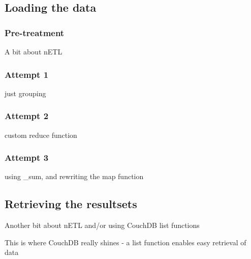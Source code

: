 \subsection{Loading the data}
\subsubsection*{Pre-treatment}
A bit about nETL

\subsubsection*{Attempt 1}
just grouping

\subsubsection*{Attempt 2}
custom reduce function

\subsubsection*{Attempt 3}
using _sum, and rewriting the map function

\subsection{Retrieving the resultsets}
Another bit about nETL and/or using CouchDB list functions

This is where CouchDB really shines - a list function enables easy retrieval of data